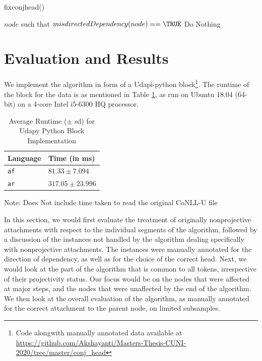 \begin{algorithm}[H]
\caption{fixconjhead()}
\label{conj-head-algo}
\begin{algorithmic}[1]
\REQUIRE $node$ such that $misdirectedDependency(node) == \TRUE$
            \STATE Do Nothing
        \ENDIF
    \ENDIF
\ENDIF
\STATE {}
    \RETURN 
{}
    \RETURN
{}
    \RETURN
\ELSE
    \RETURN
\ENDIF
\end{algorithmic}
\end{algorithm}

\section{Evaluation and Results}
\label{ssec:conj_head-results}

We implement the algorithm in form of a Udapi-python \citep{udapi} block\footnote{Code alongwith manually annotated data available at \url{https://github.com/Akshayanti/Masters-Thesis-CUNI-2020/tree/master/conj_head}}. The runtime of the block for the data is as mentioned in Table \ref{tab:conj-head-runtime}, as run on Ubuntu 18.04 (64-bit) on a 4-core Intel i5-6300 HQ processor.

\begin{table}[H]
    \centering
    \begin{tabular}{|l|l|}
        \hline
        \textbf{Language} & \textbf{Time (in ms)}\\
        \hline
        \verb|af| & $81.33 \pm 7.094$ \\
        \verb|ar| & $317.05 \pm 23.996$ \\
        \hline
    \end{tabular}
    \caption{Average Runtime ($\pm$ sd) for Udapy Python Block Implementation}
    Note: Does Not include time taken to read the original CoNLL-U file
    \label{tab:conj-head-runtime}
\end{table}

In this section, we would first evaluate the treatment of originally nonprojective attachments with respect to the individual segments of the algorithm, followed by a discussion of the instances not handled by the algorithm dealing specifically with nonprojective attachments. The instances were manually annotated for the direction of dependency, as well as for the choice of the correct head. Next, we would look at the part of the algorithm that is common to all tokens, irrespective of their projectivity status. Our focus would be on the nodes that were affected at major steps, and the nodes that were unaffected by the end of the algorithm. We then look at the overall evaluation of the algorithm, as manually annotated for the correct attachment to the parent node, on limited subsamples.

